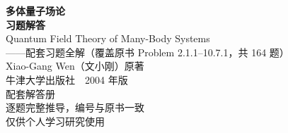 \documentclass[11pt,a4paper]{ctexbook}
\begin{document}
\frontmatter
\begin{titlepage}
\centering
{\Huge\bfseries 多体量子场论\\[0.8em]
\huge 习题解答\\[4em]}
{\Large Quantum Field Theory of Many-Body Systems\\[0.5em]
\large ——配套习题全解（覆盖原书 Problem 2.1.1--10.7.1，共 164 题）\\[3em]}
{\Large Xiao-Gang Wen（文小刚）\quad 原著\\[1em]}
{\large 牛津大学出版社　2004 年版\\[5em]}
{\large 配套解答册\\[0.5em]}
{\large 逐题完整推导，编号与原书一致\\[0.3em]
仅供个人学习研究使用\\[3em]}
\end{titlepage}
\thispagestyle{empty}\mbox{}\clearpage
\tableofcontents

\mainmatter

\setcounter{chapter}{1}










\end{document}
